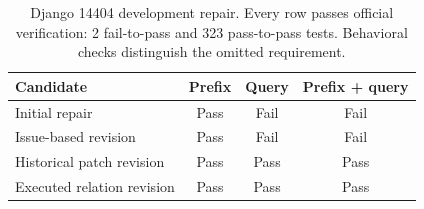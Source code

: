 \begin{table}[t]
\centering
\caption{Django 14404 development repair. Every row passes official verification: 2 fail-to-pass and 323 pass-to-pass tests. Behavioral checks distinguish the omitted requirement.}
\label{tab:residual}
\begin{tabular}{lccc}
\toprule
Candidate & Prefix & Query & Prefix + query \\
\midrule
Initial repair & Pass & Fail & Fail \\
Issue-based revision & Pass & Fail & Fail \\
Historical patch revision & Pass & Pass & Pass \\
Executed relation revision & Pass & Pass & Pass \\
\bottomrule
\end{tabular}
\end{table}
